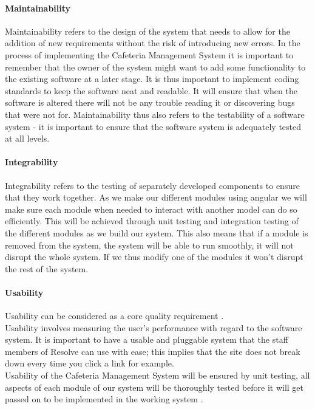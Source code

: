 \documentclass[12pt]{article}
\begin{document}
\paragraph{Maintainability\\}
Maintainability refers to the design of the system that needs to allow for the addition of new requirements without the risk of introducing new errors. In the process of implementing the Cafeteria Management System it is important to remember that the owner of the system might  want to add some functionality to the existing software at a later stage. It is thus important to implement coding standards to keep the software neat and readable. It will ensure that when the software is altered there will not be any trouble reading it or discovering bugs that were not for. Maintainability thus also refers to the testability of a software system - it is important to ensure that the software system is adequately tested at all levels.

\paragraph{Integrability\\}
Integrability  refers to the testing of separately developed components to ensure that they work together. As we make our different  modules using angular we will make sure each module when needed to interact with another model can do so efficiently. This will be achieved through unit testing and integration testing of the different modules as we build our system. This also means that if a module is removed from the system, the system will be able to run smoothly, it will not disrupt the whole system. If we thus modify one of the modules it won't disrupt the rest of the system. 

\paragraph{Usability\\}
Usability can be considered as a core quality requirement . \\
Usability involves measuring the user's performance with regard to the software system.  It is important to have a usable and pluggable system that the staff members of Resolve can use with ease; this implies that the site does not break down every time you click a link for example. \\
Usability of the Cafeteria Management System will be ensured by unit testing, all aspects of each module of our system will be thoroughly  tested before it will get passed on to be implemented in the working system .
\end{document}
